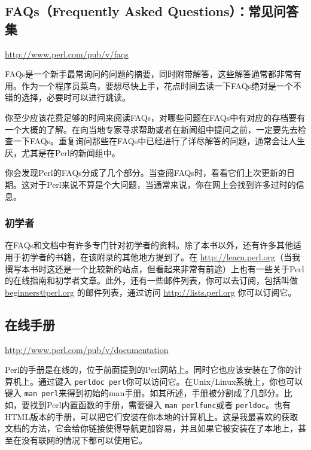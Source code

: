 \subsection{FAQs（Frequently Asked Questions）：常见问答集}
\href{http://www.perl.com/pub/v/faqs}{http://www.perl.com/pub/v/faqs}

\begin{adjustwidth}{4em}{}
FAQs是一个新手最常询问的问题的摘要，同时附带解答，这些解答通常都非常有用。作为一个程序员菜鸟，要想尽快上手，花点时间去读一下FAQs绝对是一个不错的选择，必要时可以进行跳读。
\end{adjustwidth}

你至少应该花费足够的时间来阅读FAQs，对哪些问题在FAQs中有对应的存档要有一个大概的了解。在向当地专家寻求帮助或者在新闻组中提问之前，一定要先去检查一下FAQs。重复询问那些在FAQs中已经进行了详尽解答的问题，通常会让人生厌，尤其是在Perl的新闻组中。

你会发现Perl的FAQs分成了几个部分。当查阅FAQs时，看看它们上次更新的日期。这对于Perl来说不算是个大问题，当通常来说，你在网上会找到许多过时的信息。

\subsubsection{初学者}
在FAQs和文档中有许多专门针对初学者的资料。除了本书以外，还有许多其他适用于初学者的书籍，在该附录的其他地方提到了。在 \href{http://learn.perl.org}{http://learn.perl.org}（当我撰写本书时这还是一个比较新的站点，但看起来非常有前途）上也有一些关于Perl的在线指南和初学者文章。此外，还有一些邮件列表，你可以去订阅，包括叫做 \href{mailto:beginners@perl.org}{beginners@perl.org} 的邮件列表，通过访问 \href{http://lists.perl.org}{http://lists.perl.org} 你可以订阅它。

\subsection{在线手册}
\href{http://www.perl.com/pub/v/documentation}{http://www.perl.com/pub/v/documentation}

\begin{adjustwidth}{4em}{}
Perl的手册是在线的，位于前面提到的Perl网站上。同时它也应该安装在了你的计算机上。通过键入 \verb|perldoc perl|你可以访问它。在Unix/Linux系统上，你也可以键入 \verb|man perl|来得到初始的man手册。如其所述，手册被分割成了几部分。比如，要找到Perl内置函数的手册，需要键入 \verb|man perlfunc|或者 \verb|perldoc|。也有HTML版本的手册，可以把它们安装在你本地的计算机上。这是我最喜欢的获取文档的方法，它会给你链接使得导航更加容易，并且如果它被安装在了本地上，甚至在没有联网的情况下都可以使用它。
\end{adjustwidth}

